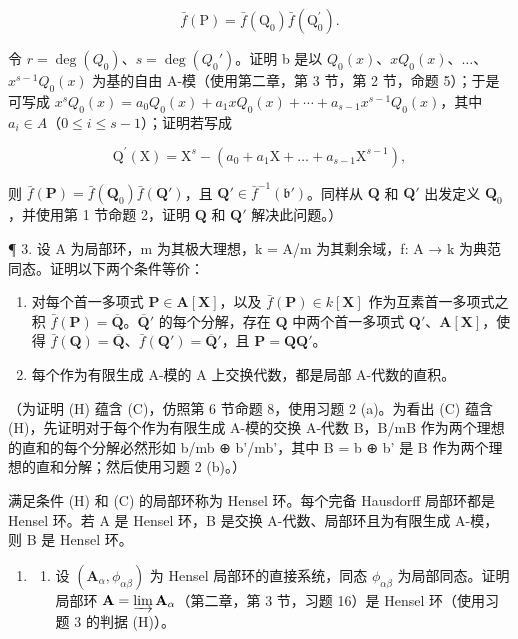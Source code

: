 \[
\bar {f} (\mathrm{P}) = \bar {f} (\mathrm{Q} _ {0}) \bar {f} (\mathrm{Q} _ {0} ^ {\prime}).
\]

令 \(r = \deg(Q_0)\)、\(s = \deg(Q_0')\)。证明 b 是以 \(Q_0(x)\)、\(xQ_0(x)\)、\(\ldots\)、\(x^{s-1}Q_0(x)\) 为基的自由 A-模（使用第二章，第 3 节，第 2 节，命题 5）；于是可写成 \(x^sQ_0(x) = a_0Q_0(x) + a_1xQ_0(x) + \cdots + a_{s-1}x^{s-1}Q_0(x)\)，其中 \(a_i \in A\)（\(0 \leqslant i \leqslant s-1\)）；证明若写成

\[
\mathrm{Q} ^ {\prime} (\mathrm{X}) = \mathrm{X} ^ {s} - (a _ {0} + a _ {1} \mathrm{X} + \dots + a _ {s - 1} \mathrm{X} ^ {s - 1}),
\]

则 \(\bar{f}(\mathbf{P}) = \bar{f}(\mathbf{Q}_0)\bar{f}(\mathbf{Q}')\)，且 \(\mathbf{Q}'\in \bar{f}^{-1}(\mathfrak{b}')\)。同样从 \(\mathbf{Q}\) 和 \(\mathbf{Q}'\) 出发定义 \(\mathbf{Q}_0\)，并使用第 1 节命题 2，证明 \(\mathbf{Q}\) 和 \(\mathbf{Q}'\) 解决此问题。）

¶ 3. 设 A 为局部环，m 为其极大理想，k = A/m 为其剩余域，f: A → k 为典范同态。证明以下两个条件等价：

\begin{enumerate}
\def\labelenumi{(\Alph{enumi})}
\setcounter{enumi}{7}
\item[(H)]
  对每个首一多项式 \(\mathbf{P} \in \mathbf{A}[\mathbf{X}]\)，以及 \(\bar{f}(\mathbf{P}) \in k[\mathbf{X}]\) 作为互素首一多项式之积 \(\bar{f}(\mathbf{P}) = \overline{\mathbf{Q}}\)。\(\overline{\mathbf{Q}}'\) 的每个分解，存在 \(\mathbf{Q}\) 中两个首一多项式 \(\mathbf{Q}'\)、\(\mathbf{A}[\mathbf{X}]\)，使得 \(\bar{f}(\mathbf{Q}) = \overline{\mathbf{Q}}\)、\(\bar{f}(\mathbf{Q}') = \overline{\mathbf{Q}}'\)，且 \(\mathbf{P} = \mathbf{QQ'}\)。
\item[(C)]
  每个作为有限生成 A-模的 A 上交换代数，都是局部 A-代数的直积。
\end{enumerate}

（为证明 (H) 蕴含 (C)，仿照第 6 节命题 8，使用习题 2 (a)。为看出 (C) 蕴含 (H)，先证明对于每个作为有限生成 A-模的交换 A-代数 B，B/mB 作为两个理想的直和的每个分解必然形如 b/mb ⊕ b'/mb'，其中 B = b ⊕ b' 是 B 作为两个理想的直和分解；然后使用习题 2 (b)。）

满足条件 (H) 和 (C) 的局部环称为 Hensel 环。每个完备 Hausdorff 局部环都是 Hensel 环。若 A 是 Hensel 环，B 是交换 A-代数、局部环且为有限生成 A-模，则 B 是 Hensel 环。

\begin{enumerate}
\def\labelenumi{\arabic{enumi}.}
\setcounter{enumi}{3}
\tightlist
\item
  \begin{enumerate}
  \def\labelenumii{(\alph{enumii})}
  \tightlist
  \item
    设 \((\mathbf{A}_{\alpha}, \phi_{\alpha \beta})\) 为 Hensel 局部环的直接系统，同态 \(\phi_{\alpha \beta}\) 为局部同态。证明局部环 \(\mathbf{A} = \varinjlim \mathbf{A}_{\alpha}\)（第二章，第 3 节，习题 16）是 Hensel 环（使用习题 3 的判据 (H)）。
  \end{enumerate}
\end{enumerate}

